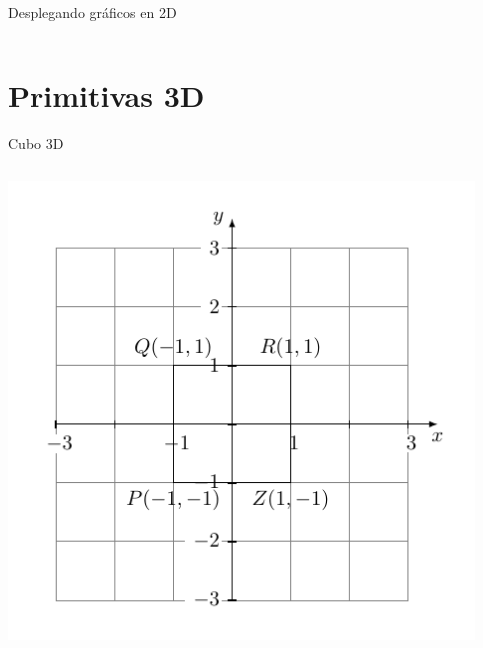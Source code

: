 \documentclass[aspectratio=169,compress]{beamer}
\begin{document}
\begin{frame}{Desplegando gráficos en 2D}
\begin{columns}
\begin{column}{0.5\textwidth}
\begin{center}
\end{center}
\end{column}
\end{columns}


\end{frame}




\section{Primitivas 3D}
\begin{frame}{Cubo 3D}

\begin{columns}
\begin{column}{0.4\textwidth}



\begin{center}
 \includegraphics[width=0.98\textwidth]{FigsOpenGL/planocartersiano}
 \end{center}
\end{column}
\begin{column}{0.4\textwidth}
\begin{center}


\end{center}
\end{column}
\end{columns}
\end{frame}
\end{document}
